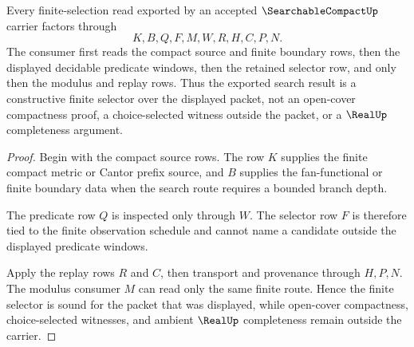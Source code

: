 \begin{theorem}
\label{thm:searchable-compact-finite-selection-soundness}
Every finite-selection read exported by an accepted $\SearchableCompactUp$ carrier factors through
$$
K,B,Q,F,M,W,R,H,C,P,N .
$$
The consumer first reads the compact source and finite boundary rows, then the displayed decidable predicate windows, then the retained selector row, and only then the modulus and replay rows. Thus the exported search result is a constructive finite selector over the displayed packet, not an open-cover compactness proof, a choice-selected witness outside the packet, or a $\RealUp$ completeness argument.
\end{theorem}
\begin{proof}
Begin with the compact source rows. The row $K$ supplies the finite compact metric or Cantor prefix source, and $B$ supplies the fan-functional or finite boundary data when the search route requires a bounded branch depth.

The predicate row $Q$ is inspected only through $W$. The selector row $F$ is therefore tied to the finite observation schedule and cannot name a candidate outside the displayed predicate windows.

Apply the replay rows $R$ and $C$, then transport and provenance through $H,P,N$. The modulus consumer $M$ can read only the same finite route. Hence the finite selector is sound for the packet that was displayed, while open-cover compactness, choice-selected witnesses, and ambient $\RealUp$ completeness remain outside the carrier.
\end{proof}




